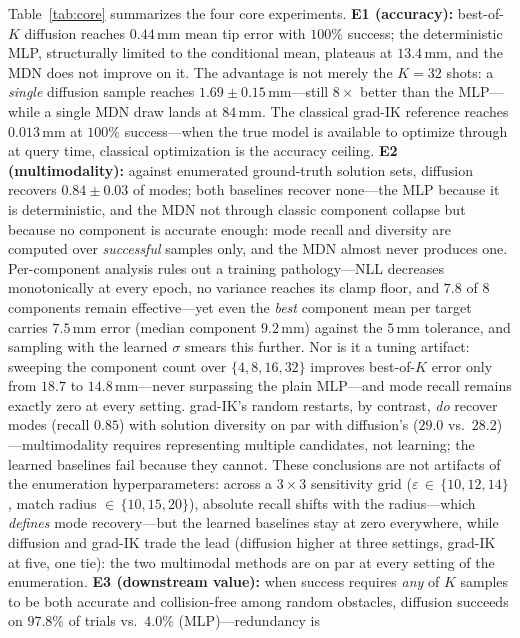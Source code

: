 Table~\ref{tab:core} summarizes the four core experiments. \textbf{E1
(accuracy):} best-of-$K$ diffusion reaches $0.44\,$mm mean tip error with
$100\%$ success; the deterministic MLP, structurally limited to the
conditional mean, plateaus at $13.4\,$mm, and the MDN does not improve on
it. The advantage is not merely the $K{=}32$ shots: a \emph{single}
diffusion sample reaches $1.69\pm0.15\,$mm---still $8\times$ better than
the MLP---while a single MDN draw lands at $84\,$mm. The classical grad-IK
reference reaches $0.013\,$mm at $100\%$ success---when the true model is
available to optimize through at query time, classical optimization is the
accuracy ceiling.
\textbf{E2 (multimodality):} against enumerated ground-truth solution sets,
diffusion recovers $0.84\pm0.03$ of modes; both baselines recover none---the
MLP because it is deterministic, and the MDN not through classic component
collapse but because no component is accurate enough: mode recall and
diversity are computed over \emph{successful} samples only, and the MDN
almost never produces one. Per-component analysis rules out a training
pathology---NLL decreases monotonically at every epoch, no variance reaches
its clamp floor, and $7.8$ of $8$ components remain effective---yet even the
\emph{best} component mean per target carries $7.5\,$mm error (median
component $9.2\,$mm) against the $5\,$mm tolerance, and sampling with the
learned $\sigma$ smears this further. Nor is it a tuning artifact: sweeping
the component count over $\{4,8,16,32\}$ improves best-of-$K$ error only
from $18.7$ to $14.8\,$mm---never surpassing the plain MLP---and mode recall
remains exactly zero at every setting. grad-IK's random restarts, by
contrast, \emph{do} recover modes (recall $0.85$) with solution diversity
on par with diffusion's ($29.0$ vs.\ $28.2$)---multimodality requires
representing multiple candidates, not learning; the learned baselines fail
because they cannot. These conclusions are not artifacts of the enumeration
hyperparameters: across a $3{\times}3$ sensitivity grid
($\varepsilon\,{\in}\,\{10,12,14\}$, match radius ${\in}\,\{10,15,20\}$),
absolute recall shifts with the radius---which \emph{defines} mode
recovery---but the learned baselines stay at zero everywhere, while
diffusion and grad-IK trade the lead (diffusion higher at three settings,
grad-IK at five, one tie): the two multimodal methods are on par at every
setting of the enumeration. \textbf{E3 (downstream value):} when success requires \emph{any} of
$K$ samples to be both accurate and collision-free among random obstacles,
diffusion succeeds on $97.8\%$ of trials vs.\ $4.0\%$ (MLP)---redundancy is
